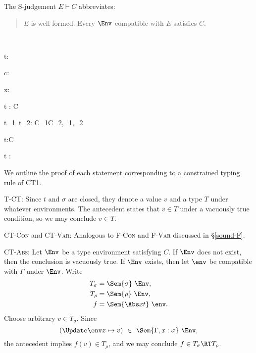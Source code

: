 \documentclass{amsart}
\theoremstyle{definition}
\begin{document}
\begin{samepage}
The S-judgement $E\vdash C$ abbreviates:
\begin{quotation}
$E$ is well-formed. Every $\Env$ compatible with $E$ satisfies $C$.
\end{quotation}
\end{samepage}


~

{t:\rho}

{\Gamma\vdash c:\rho \Given \emptyset}

{\Gamma\vdash x:\sigma\Given\emptyset}

{\Gamma\vdash{}t : \sigma\R\rho\Given C}

{\Gamma\vdash t_1~t_2:\beta
\Given C_1\cup C_2,\rho_1\le\alpha\R\beta,\rho_2\le\alpha
}

{\Gamma\vdash\Tabs\alpha t:\All\alpha\rho\Given C}

{\Gamma\vdash t :
\cdots{}\rho
\Given\emptyset}

\label{sound-CT}

We outline the proof of each statement corresponding to a
constrained typing rule of CT1.

\textsc{T-CT}: Since $t$ and $\sigma$ are closed, they denote a
value $v$ and a type $T$ under whatever environments. The
antecedent states that $v\in T$ under a vacuously true condition,
so we may conclude $v\in T$.

\textsc{CT-Con} and \textsc{CT-Var}: Analogous to \textsc{F-Con}
and \textsc{F-Var} discussed in \S\ref{sound-F}.

\textsc{CT-Abs}: Let $\Env$ be a type environment satisfying $C$.
If $\Env$ does not exist, then the conclusion is vacuously true.
If $\Env$ exists, then let $\env$ be compatible with $\Gamma$
under $\Env$. Write
\begin{align*}
T_\sigma&=\Sem{\sigma}~\Env,\\
T_\rho&=\Sem{\rho}~\Env,\\
f&=\Sem{\Abs x t}~\env.
\end{align*}
Choose arbitrary $v\in T_\sigma$. Since
\[
(\Update\env x\mapsto v)\ \in\ \Sem{\Gamma,x:\sigma}~\Env,
\]
the antecedent implies $f(v)\in T_\rho$, and we may conclude
$f\in T_\sigma \RT T_\rho$.
\end{document}
